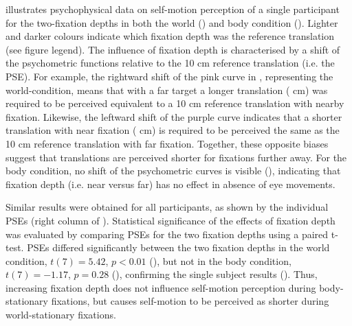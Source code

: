  illustrates psychophysical data on self-motion perception of a single participant for the two-fixation depths in both the world () and body condition (). Lighter and darker colours indicate which fixation depth was the reference translation (see figure legend). The influence of fixation depth is characterised by a shift of the psychometric functions relative to the 10 \si{\centi\metre} reference translation (i.e. the PSE). For example, the rightward shift of the pink curve in , representing the world-condition, means that with a far target a longer translation ( \si{\centi\metre}) was required to be perceived equivalent to a 10 \si{\centi\metre} reference translation with nearby fixation. Likewise, the leftward shift of the purple curve indicates that a shorter translation with near fixation ( \si{\centi\metre}) is required to be perceived the same as the 10 \si{\centi\metre} reference translation with far fixation. Together, these opposite biases suggest that translations are perceived shorter for fixations further away. For the body condition, no shift of the psychometric curves is visible (), indicating that fixation depth (i.e. near versus far) has no effect in absence of eye movements.

Similar results were obtained for all participants, as shown by the individual PSEs (right column of ). Statistical significance of the effects of fixation depth was evaluated by comparing PSEs for the two fixation depths using a paired t-test. PSEs  differed significantly between the two fixation depths in the world condition, $t(7) = 5.42$, $p < 0.01$ (), but not in the body condition, $t(7) = -1.17$, $p = 0.28$ (), confirming the single subject results (). Thus, increasing fixation depth does not influence self-motion perception during body-stationary fixations, but causes self-motion to be perceived as shorter during world-stationary fixations.

